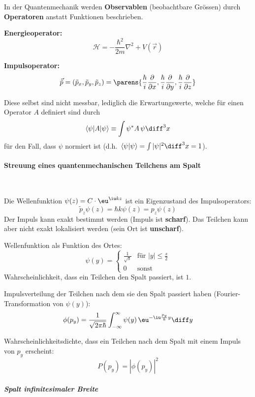 			In der Quantenmechanik werden \textbf{Observablen} (beobachtbare Grössen) durch \textbf{Operatoren} anstatt Funktionen beschrieben.
		
			\textbf{Energieoperator:}
			\[
				\mathscr H = - \frac{\hbar^2}{2m} \nabla^2 + V(\vec r)
			\]
		
			\textbf{Impulsoperator:}
			\[
				\vec{\tilde{p}} = (\tilde p_x, \tilde p_y, \tilde p_z) = \parens{
					\frac{\hbar}{i} \frac{\partial}{\partial x},
					\frac{\hbar}{i} \frac{\partial}{\partial y},
					\frac{\hbar}{i} \frac{\partial}{\partial z}
				}
			\]
		
			Diese selbst sind nicht messbar, lediglich die Erwartungswerte, welche für einen Operator $A$ definiert sind durch
			\[
				\langle \psi |A| \psi \rangle \equiv \int \psi^* A \,\psi \diff^3 x
			\]
			für den Fall, dass $\psi$ normiert ist (d.h.~$\langle \psi | \psi \rangle = \int |\psi|^2 \diff^3 x = 1$).
		\paragraph{Streuung eines quantenmechanischen Teilchens am Spalt} %
			~
			
			Die Wellenfunktion $\psi(z) = C\cdot \eu^{\iu kz}$ ist ein Eigenzustand des Impulsoperators:
			\[
				\tilde p_z \psi(z) = \hbar k \psi(z) = p_z \psi(z)
			\]
			Der Impuls kann exakt bestimmt werden (Impuls ist \textbf{scharf}). Das Teilchen kann aber nicht exakt lokalisiert werden (sein Ort ist \textbf{unscharf}).
			
			Wellenfunktion als Funktion des Ortes:
			\[
				\psi(y) = \left\{\begin{array}{cl}
					\frac{1}{\sqrt{s}} & \text{für } |y| \le \frac{s}{2} \\
					0 & \text{sonst}
				\end{array}\right.
			\]
			Wahrscheinlichkeit, dass ein Teilchen den Spalt passiert, ist $1$.
			
			Impulsverteilung der Teilchen nach dem sie den Spalt passiert haben (Fourier-Transformation von $\psi(y)$):
			\[
				\phi(p_y) = \frac{1}{\sqrt{2\pi\hbar}} \int_{-\infty}^\infty \psi(y)\, \eu^{-\iu \frac{p_y}{\hbar}y} \diff y
			\]
			
			Wahrscheinlichkeitsdichte, dass ein Teilchen nach dem Spalt mit einem Impuls von $p_y$ erscheint:
			\[
				P(p_y) = |\phi(p_y)|^2
			\]
			
			\subparagraph{Spalt infinitesimaler Breite} %
				~
				
